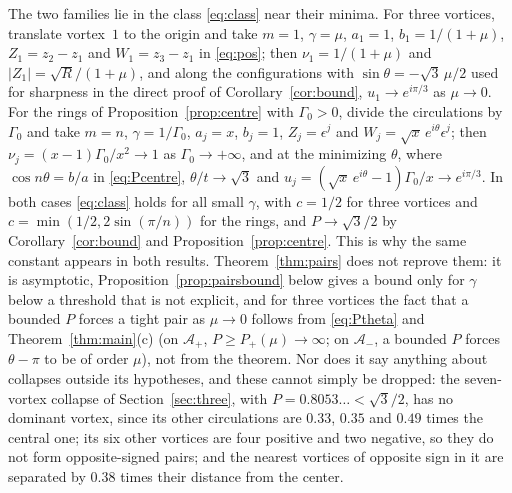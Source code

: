 \documentclass[11pt]{article}
\theoremstyle{definition}
\newcommand{\Ap}{\mathcal{A}_+}
\newcommand{\Am}{\mathcal{A}_-}
\begin{document}
The two families lie in the class \eqref{eq:class} near their minima. For three vortices, translate vortex~$1$ to the origin and take $m = 1$, $\gamma = \mu$, $a_1 = 1$, $b_1 = 1/(1 + \mu)$, $Z_1 = z_2 - z_1$ and $W_1 = z_3 - z_1$ in \eqref{eq:pos}; then $\nu_1 = 1/(1 + \mu)$ and $|Z_1| = \sqrt{R}/(1 + \mu)$, and along the configurations with $\sin\theta = -\sqrt{3}\,\mu/2$ used for sharpness in the direct proof of Corollary~\ref{cor:bound}, $u_1 \to e^{i\pi/3}$ as $\mu \to 0$. For the rings of Proposition~\ref{prop:centre} with $\Gamma_0 > 0$, divide the circulations by $\Gamma_0$ and take $m = n$, $\gamma = 1/\Gamma_0$, $a_j = x$, $b_j = 1$, $Z_j = \epsilon^j$ and $W_j = \sqrt{x}\,e^{i\theta}\epsilon^j$; then $\nu_j = (x - 1)\Gamma_0/x^2 \to 1$ as $\Gamma_0 \to +\infty$, and at the minimizing $\theta$, where $\cos n\theta = b/a$ in \eqref{eq:Pcentre}, $\theta/t \to \sqrt{3}$ and $u_j = (\sqrt{x}\,e^{i\theta} - 1)\Gamma_0/x \to e^{i\pi/3}$. In both cases \eqref{eq:class} holds for all small $\gamma$, with $c = 1/2$ for three vortices and $c = \min(1/2, 2\sin(\pi/n))$ for the rings, and $P \to \sqrt{3}/2$ by Corollary~\ref{cor:bound} and Proposition~\ref{prop:centre}. This is why the same constant appears in both results. Theorem~\ref{thm:pairs} does not reprove them: it is asymptotic, Proposition~\ref{prop:pairsbound} below gives a bound only for $\gamma$ below a threshold that is not explicit, and for three vortices the fact that a bounded $P$ forces a tight pair as $\mu \to 0$ follows from \eqref{eq:Ptheta} and Theorem~\ref{thm:main}(c) (on $\Ap$, $P \ge P_+(\mu) \to \infty$; on $\Am$, a bounded $P$ forces $\theta - \pi$ to be of order $\mu$), not from the theorem. Nor does it say anything about collapses outside its hypotheses, and these cannot simply be dropped: the seven-vortex collapse of Section~\ref{sec:three}, with $P = 0.8053\ldots < \sqrt{3}/2$, has no dominant vortex, since its other circulations are $0.33$, $0.35$ and $0.49$ times the central one; its six other vortices are four positive and two negative, so they do not form opposite-signed pairs; and the nearest vortices of opposite sign in it are separated by $0.38$ times their distance from the center.
\end{document}
